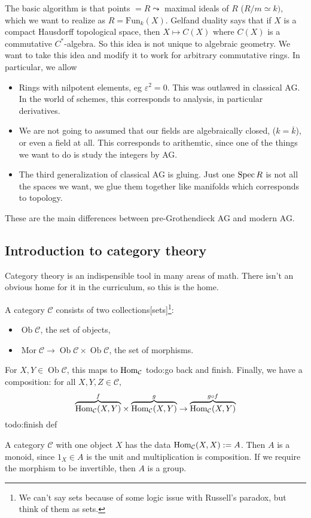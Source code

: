 The basic algorithm is that points $=R \leadsto$ maximal ideals of $R$ ($R /m\simeq k)$, which we want to realize as  $R=\mathrm{Fun}_k(X)$. Gelfand duality says that if $X$ is a compact Hausdorff topological space, then $X \mapsto C(X)$ where $C(X)$ is a commutative $C^*$-algebra. So this idea is not unique to algebraic geometry. We want to take this idea and modify it to work for arbitrary commutative rings. In particular, we allow
\begin{itemize}
\setlength\itemsep{-.2em}
    \item Rings with nilpotent elements, eg $\varepsilon  ^2=0$. This was outlawed in classical AG. In the world of schemes, this corresponds to analysis, in particular derivatives.
    \item We are not going to assumed that our fields are algebraically closed, ($k= \overline{k}$), or even a field at all. This corresponds to arithemtic, since one of the things we want to do is study the integers by AG.
    \item The third generalization of classical AG is gluing. Just one $\operatorname{Spec} R$ is not all the spaces we want, we glue them together like manifolds which corresponds to topology.
\end{itemize}
These are the main differences between pre-Grothendieck AG and modern AG.
\subsection{Introduction to category theory}
Category theory is an indispensible tool in many areas of math. There isn't an obvious home for it in the curriculum, so this is the home.

\begin{definition}[]
    A category $\mathcal{C} $ consists of two collections[sets]\footnote{We can't say sets because of some logic issue with Russell's paradox, but think of them as sets.}:
    \begin{itemize}
    \setlength\itemsep{-.2em}
        \item $\operatorname{Ob}\mathcal{C} $, the set of objects,
        \item $\operatorname{Mor}\mathcal{C} \to \operatorname{Ob}\mathcal{C} \times \operatorname{Ob}\mathcal{C} $, the set of morphisms.
    \end{itemize}
    For $X,Y \in \operatorname{Ob}\mathcal{C} $, this maps to $\operatorname{Hom}_{ \mathcal{C} }$ {\color{red}todo:go back and finish}. Finally, we have a composition: for all $X,Y,Z \in \mathcal{C} $, \[
        \overset{f}{\overbrace{\operatorname{Hom} _{\mathcal{C} }(X,Y)} } \times  \overset{g}{\overbrace{\operatorname{Hom} _{\mathcal{C} }(X,Y)} } \to \overset{g \circ f}{\overbrace{\operatorname{Hom} _{\mathcal{C} }(X,Y)} }
    \] {\color{red}todo:finish def} 
\end{definition}
\begin{example}
    A category $\mathcal{C} $ with one object $X$ has the data $\operatorname{Hom} _{\mathcal{C} }(X,X):=A$. Then $A$ is a monoid, since $1_X \in A$ is the unit and multiplication is composition. If we require the morphism to be invertible, then $A$ is a group.
\end{example}

